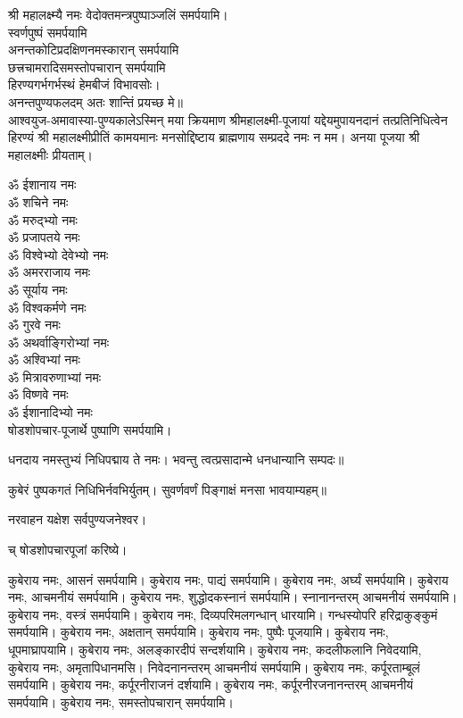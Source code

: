 \begin{center}
श्री महालक्ष्म्यै नमः वेदोक्तमन्त्रपुष्पाञ्जलिं समर्पयामि।\\

स्वर्णपुष्पं समर्पयामि\\
 
अनन्तकोटिप्रदक्षिणनमस्कारान् समर्पयामि\\

छत्त्रचामरादिसमस्तोपचारान् समर्पयामि\\

हिरण्यगर्भगर्भस्थं हेमबीजं विभावसोः।\\
अनन्तपुण्यफलदम् अतः शान्तिं प्रयच्छ मे॥\\

आश्वयुज-अमावास्या-पुण्यकालेऽस्मिन् मया क्रियमाण श्री\-महा\-लक्ष्मी-पूजायां
यद्देयमुपायन\-दानं तत्प्रति\-निधित्वेन हिरण्यं श्री महा\-लक्ष्मी\-प्रीतिं
कामयमानः मनसोद्दिष्टाय ब्राह्मणाय सम्प्रददे नमः न मम। 
अनया पूजया श्री महालक्ष्मीः प्रीयताम्। 
\end{center}


ॐ ईशानाय नमः\\
ॐ शचिने नमः\\
ॐ मरुद्भ्यो नमः\\
ॐ प्रजापतये नमः\\
ॐ विश्वेभ्यो देवेभ्यो नमः\\
ॐ अमरराजाय नमः\\
ॐ सूर्याय नमः\\
ॐ विश्वकर्मणे नमः\\
ॐ गुरवे नमः\\
ॐ अथर्वाङ्गिरोभ्यां नमः\\
ॐ अश्विभ्यां नमः\\
ॐ मित्रावरुणाभ्यां नमः\\
ॐ विष्णवे नमः\\
ॐ ईशानादिभ्यो नमः\\

षोडशोपचार-पूजार्थे पुष्पाणि समर्पयामि।




धनदाय नमस्तुभ्यं निधिपद्माय ते नमः।
भवन्तु त्वत्प्रसादान्मे धनधान्यानि सम्पदः॥

कुबेरं पुष्पकगतं निधिभिर्नवभिर्युतम्।
सुवर्णवर्णं पिङ्गाक्षं मनसा भावयाम्यहम्॥

नरवाहन यक्षेश सर्वपुण्यजनेश्वर।

च् षोडशोपचारपूजां करिष्ये।


कुबेराय नमः, आसनं समर्पयामि।
कुबेराय नमः, पाद्यं समर्पयामि।
कुबेराय नमः, अर्घ्यं समर्पयामि।
कुबेराय नमः, आचमनीयं समर्पयामि।
कुबेराय नमः, शुद्धोदकस्नानं समर्पयामि। स्नानानन्तरम् आचमनीयं समर्पयामि।
कुबेराय नमः, वस्त्रं समर्पयामि।
कुबेराय नमः, दिव्यपरिमलगन्धान् धारयामि। गन्धस्योपरि हरिद्राकुङ्कुमं समर्पयामि।
कुबेराय नमः, अक्षतान् समर्पयामि।
कुबेराय नमः, पुष्पैः पूजयामि।
कुबेराय नमः, धूपमाघ्रापयामि।
कुबेराय नमः, अलङ्कारदीपं सन्दर्शयामि।
कुबेराय नमः, कदलीफलानि निवेदयामि, \\
कुबेराय नमः, अमृतापिधानमसि। निवेदनानन्तरम् आचमनीयं समर्पयामि।
कुबेराय नमः, कर्पूरताम्बूलं समर्पयामि।
कुबेराय नमः, कर्पूरनीराजनं दर्शयामि।
कुबेराय नमः, कर्पूरनीरजनानन्तरम् आचमनीयं समर्पयामि।
कुबेराय नमः, समस्तोपचारान् समर्पयामि।



